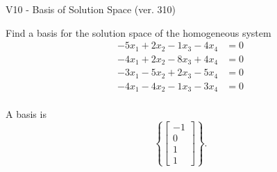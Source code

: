 \begin{exercise}
  \begin{exerciseTitle}V10 - Basis of Solution Space (ver. 310)\end{exerciseTitle}
  \begin{exerciseStatement}
    Find a basis for the solution space of the homogeneous system 
\begin{align*}
 -5 x_ 1 + 2 x_ 2 -1 x_ 3 -4 x_ 4 &= 0  \\ 
  -4 x_ 1 + 2 x_ 2 -8 x_ 3 + 4 x_ 4 &= 0  \\ 
  -3 x_ 1 -5 x_ 2 + 2 x_ 3 -5 x_ 4 &= 0  \\ 
  -4 x_ 1 -4 x_ 2 -1 x_ 3 -3 x_ 4 &= 0  \\ 
 \end{align*}


 
  \end{exerciseStatement}

  \begin{exerciseAnswer}
   A basis is   
\[\left\{\left[\begin{array}{c}
-1 \\
0 \\
1 \\
1
\end{array}\right]\right\}.\]

  


  \end{exerciseAnswer}
\end{exercise}